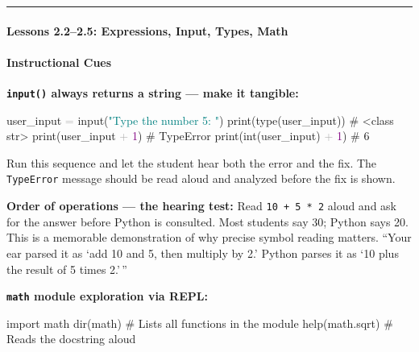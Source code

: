 \documentclass[
  justified,
  openright,
]{tufte-book}
\let\subsubsection\paragraph
\let\paragraph\paragraph
\newcommand{\BuiltInTok}[1]{#1}
\newcommand{\CommentTok}[1]{\textcolor{MidGray}{#1}}
\newcommand{\DecValTok}[1]{\textcolor{Purple}{#1}}
\newcommand{\ImportTok}[1]{\textcolor{BrandAccent}{#1}}
\newcommand{\NormalTok}[1]{#1}
\newcommand{\OperatorTok}[1]{\textcolor{DarkGray}{#1}}
\newcommand{\StringTok}[1]{\textcolor{Teal}{#1}}
\newenvironment{Shaded}{%
  \begin{snugshade}
}{%
  \end{snugshade}
}
\let\subsubsection\paragraph
\let\paragraph\paragraph
\begin{document}
\begin{center}\rule{0.5\linewidth}{0.5pt}\end{center}

\subsubsection{Lessons 2.2--2.5: Expressions, Input, Types,
Math}\label{lessons-2.22.5-expressions-input-types-math}

\paragraph{Instructional Cues}\label{instructional-cues-6}

\textbf{\texttt{input()} always returns a string --- make it tangible:}

\begin{Shaded}
\begin{Highlighting}[]
\NormalTok{user\_input }\OperatorTok{=} \BuiltInTok{input}\NormalTok{(}\StringTok{"Type the number 5: "}\NormalTok{)}
\BuiltInTok{print}\NormalTok{(}\BuiltInTok{type}\NormalTok{(user\_input))   }\CommentTok{\# \textless{}class \textquotesingle{}str\textquotesingle{}\textgreater{}}
\BuiltInTok{print}\NormalTok{(user\_input }\OperatorTok{+} \DecValTok{1}\NormalTok{)      }\CommentTok{\# TypeError}
\BuiltInTok{print}\NormalTok{(}\BuiltInTok{int}\NormalTok{(user\_input) }\OperatorTok{+} \DecValTok{1}\NormalTok{) }\CommentTok{\# 6}
\end{Highlighting}
\end{Shaded}

Run this sequence and let the student hear both the error and the fix.
The \texttt{TypeError} message should be read aloud and analyzed before
the fix is shown.

\textbf{Order of operations --- the hearing test:} Read
\texttt{10\ +\ 5\ *\ 2} aloud and ask for the answer before Python is
consulted. Most students say 30; Python says 20. This is a memorable
demonstration of why precise symbol reading matters. ``Your ear parsed
it as `add 10 and 5, then multiply by 2.' Python parses it as `10 plus
the result of 5 times 2.'\,''

\textbf{\texttt{math} module exploration via REPL:}

\begin{Shaded}
\begin{Highlighting}[]
\ImportTok{import}\NormalTok{ math}
\BuiltInTok{dir}\NormalTok{(math)  }\CommentTok{\# Lists all functions in the module}
\BuiltInTok{help}\NormalTok{(math.sqrt)  }\CommentTok{\# Reads the docstring aloud}
\end{Highlighting}
\end{Shaded}
\end{document}
